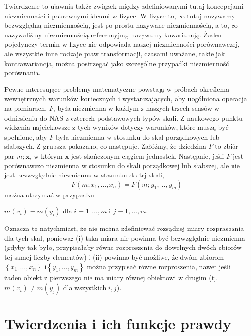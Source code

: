 \documentclass[12pt,a4paper]{report}
\newcommand{\zbior}[1]{\left\lbrace {#1} \right\rbrace }
\begin{document}
Twierdzenie to ujawnia także związek między zdefiniowanymi tutaj koncepcjami niezmienności i pokrewnymi ideami w fizyce. W fizyce to, co tutaj nazywamy bezwzględną niezmiennością, jest po prostu nazywane niezmiennością, a to, co nazywaliśmy niezmiennością referencyjną, nazywamy kowariancją. Żaden pojedynczy termin w fizyce nie odpowiada naszej niezmienności porównawczej, ale wszystkie inne rodzaje praw transformacji, czasami uważane, takie jak kontrawariancja, można postrzegać jako szczególne przypadki niezmienność porównania.

Pewne interesujące problemy matematyczne powstają w próbach określenia wewnętrznych warunków koniecznych i wystarczających, aby uogólniona operacja na pomiarach, $F$, była niezmienna w każdym z naszych trzech sensów w odniesieniu do NAS z czterech podstawowych typów skali. Z naukowego punktu widzenia najciekawsze z tych wyników dotyczy warunków, które muszą być spełnione, aby $F$ była niezmienna w stosunku do skal porządkowych lub słabszych. Z grubsza pokazano, co następuje. Załóżmy, że dziedzina $F$ to zbiór par $m; \textbf{x}$, w którym $\textbf{x}$ jest skończonym ciągiem jednostek. Następnie, jeśli $F$ jest porównawczo niezmienna w stosunku do skali porządkowej lub słabszej, ale nie jest
bezwzględnie niezmienna w stosunku do tej skali,
\begin{equation*}
F(m;x_{1},\dots,x_{n})=F(m;y_{1},\dots,y_{m})
\end{equation*}
można otrzymać w przypadku
\begin{center}
$m(x_{i})=m(y_{i})$ dla $i=1,\dots,m$ i $j=1,\dots,m$.
\end{center}
Oznacza to natychmiast, że nie można zdefiniować rozsądnej miary rozpraszania dla tych skal, ponieważ (i) taka miara nie powinna być bezwzględnie niezmienna (gdyby tak było, przypisałaby równe rozproszenia do dowolnych dwóch zbiorów tej samej liczby elementów) i (ii) powinno być możliwe, że dwóm zbiorom $\zbior{x_{1},\dots,x_{n}}$  i$\zbior{y_{1},\dots,y_{m}}$ można przypisać równe rozproszenia, nawet jeśli żaden obiekt z pierwszego nie ma miary równej obiektowi w drugim (tj.$ m(x_{i})\neq m(y_{j})$  dla wszystkich $i, j$).
\section{Twierdzenia i ich funkcje prawdy}
\end{document}
